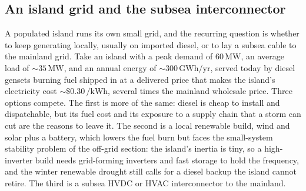 \subsection{An island grid and the subsea interconnector}

A populated island runs its own small grid, and the recurring question is
whether to keep generating locally, usually on imported diesel, or to lay a
subsea cable to the mainland grid. Take an island with a peak demand of
$60\,\si{\mega\watt}$, an average load of $\sim 35\,\si{\mega\watt}$, and an
annual energy of $\sim 300\,\si{\giga\watt\hour}/\text{yr}$, served today by
diesel gensets burning fuel shipped in at a delivered price that makes the
island's electricity cost $\sim \$0.30\,\si{\per\kilo\watt\hour}$, several
times the mainland wholesale price. Three options compete. The first is more
of the same: diesel is cheap to install and dispatchable, but its fuel cost
and its exposure to a supply chain that a storm can cut are the reasons to
leave it. The second is a local renewable build, wind and solar plus a
battery, which lowers the fuel burn but faces the small-system stability
problem of the off-grid section: the island's inertia is tiny, so a
high-inverter build needs grid-forming inverters and fast storage to hold the
frequency, and the winter renewable drought still calls for a diesel backup
the island cannot retire. The third is a subsea HVDC or HVAC interconnector to
the mainland.

